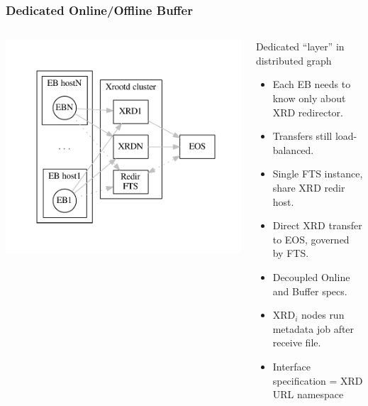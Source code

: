\documentclass[xcolor=dvipsnames]{beamer}
\begin{document}
\begin{frame}
  \frametitle{Dedicated Online/Offline Buffer} 
  \begin{columns}
    \begin{column}{0.4\textwidth}
      \includegraphics[width=\textwidth,clip,trim=5mm 0 5mm 0]{figures/doob-join.pdf}
    \end{column}
    \begin{column}{0.65\textwidth}
      Dedicated ``layer'' in distributed graph
      \begin{itemize}\footnotesize
      \item Each EB needs to know only about XRD redirector.
      \item Transfers still load-balanced.
      \item Single FTS instance, share XRD redir host.
      \item Direct XRD transfer to EOS, governed by FTS.
      \item Decoupled Online and Buffer specs.
      \item XRD$_i$ nodes run metadata job after receive file.
      \item Interface specification = XRD URL namespace
      \end{itemize}
    \end{column}
  \end{columns}
  
\end{frame}
\end{document}
